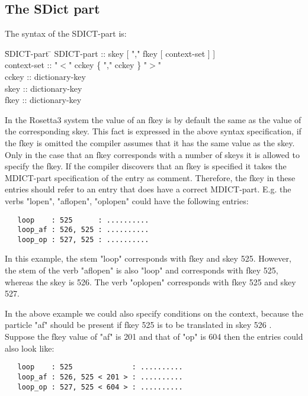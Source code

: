 \subsection {The SDict part}

The syntax of the SDICT-part is:

\begin {tabbing}
   \= SDICT-part \= \kill
   \> SDICT-part \> :: skey [ "," fkey [ context-set ] ] \\
   \> context-set \> :: "$<$" cckey \{ "," cckey \} "$>$" \\
   \> cckey       \> :: dictionary-key \\
   \> skey        \> :: dictionary-key \\
   \> fkey        \> :: dictionary-key
\end {tabbing}

In the Rosetta3 system the value of an fkey is by default the same as the
value of the corresponding skey. This fact is expressed in the above syntax
specification, if the fkey is omitted the compiler assumes that it has the
same value as the skey.
Only in the case that an fkey corresponds with a number of skeys it is 
allowed to specify the fkey. If the compiler discovers that an fkey is
specified it takes the MDICT-part specification of the entry as comment.
Therefore, the fkey in these entries should refer to an entry that does have a 
correct MDICT-part. E.g. the verbs "lopen", "aflopen", "oplopen" could have
the following entries:

\begin{verbatim}
   loop    : 525      : ..........
   loop_af : 526, 525 : ..........
   loop_op : 527, 525 : ..........
\end{verbatim}

In this example, the stem "loop" corresponds with fkey and skey 525. However,
the stem of the verb "aflopen" is also "loop" and corresponds with fkey 525,
whereas the skey is 526. The verb "oplopen" corresponds with fkey 525 and skey 
527.

In the above example we could also specify conditions on the context, because
the particle "af" should be present if fkey 525 is to be translated in skey 526
. Suppose the fkey value of "af" is 201 and that of "op" is 604 then the 
entries could also look like:

\begin{verbatim}
   loop    : 525              : ..........
   loop_af : 526, 525 < 201 > : ..........
   loop_op : 527, 525 < 604 > : ..........
\end{verbatim}

